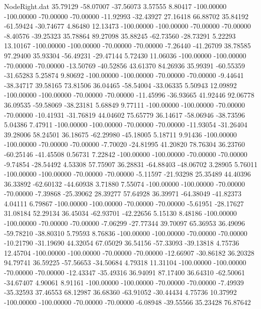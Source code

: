 \begin{filecontents}{NodeRight.dat}
  35.79129  -58.07007  -37.56073     3.57555    8.80417 -100.00000 -100.00000  -70.00000  -70.00000  -11.92993  -32.43927   27.16418   66.88702
  35.84192  -61.59424  -30.74677     4.86480   12.13473 -100.00000 -100.00000  -70.00000  -70.00000   -8.40576  -39.25323   35.78864   89.27098
  35.88245  -62.73560  -28.73291     5.22293   13.10167 -100.00000 -100.00000  -70.00000  -70.00000   -7.26440  -41.26709   38.78585   97.29400
  35.93304  -56.49231  -29.47144     5.72430   11.06036 -100.00000 -100.00000  -70.00000  -70.00000  -13.50769  -40.52856   43.61370   84.26936
  35.99391  -60.55359  -31.65283     5.25874    9.80692 -100.00000 -100.00000  -70.00000  -70.00000   -9.44641  -38.34717   39.58165   73.81506
  36.04465  -58.54004  -33.06335     5.50943   12.09892 -100.00000 -100.00000  -70.00000  -70.00000  -11.45996  -36.93665   41.92446   92.06778
  36.09535  -59.58069  -38.23181     5.68849    9.77111 -100.00000 -100.00000  -70.00000  -70.00000  -10.41931  -31.76819   44.04602   75.65779
  36.14617  -58.06946  -38.73596     5.04386    7.47911 -100.00000 -100.00000  -70.00000  -70.00000  -11.93054  -31.26404   39.28006   58.24501
  36.18675  -62.29980  -45.18005     5.18711    9.91436 -100.00000 -100.00000  -70.00000  -70.00000   -7.70020  -24.81995   41.20820   78.76304
  36.23760  -60.25146  -41.45508     0.56731    7.22842 -100.00000 -100.00000  -70.00000  -70.00000   -9.74854  -28.54492    4.53308   57.75907
  36.28831  -64.88403  -48.06702     3.28905    5.76011 -100.00000 -100.00000  -70.00000  -70.00000   -5.11597  -21.93298   25.35489   44.40396
  36.33892  -62.60132  -44.60938     3.71880    7.55074 -100.00000 -100.00000  -70.00000  -70.00000   -7.39868  -25.39062   28.39277   57.64928
  36.39971  -64.38049  -41.82373     4.04111    6.79867 -100.00000 -100.00000  -70.00000  -70.00000   -5.61951  -28.17627   31.08184   52.29134
  36.45034  -62.93701  -42.22656     5.15130    8.48186 -100.00000 -100.00000  -70.00000  -70.00000   -7.06299  -27.77344   39.70097   65.36953
  36.49096  -59.78210  -38.80310     5.79593    8.76836 -100.00000 -100.00000  -70.00000  -70.00000  -10.21790  -31.19690   44.32054   67.05029
  36.54156  -57.33093  -39.13818     4.75736   12.45704 -100.00000 -100.00000  -70.00000  -70.00000  -12.66907  -30.86182   36.20328   94.79741
  36.59225  -57.56653  -34.50684     4.79318   11.31104 -100.00000 -100.00000  -70.00000  -70.00000  -12.43347  -35.49316   36.94091   87.17400
  36.64310  -62.50061  -34.67407     4.90061    8.91161 -100.00000 -100.00000  -70.00000  -70.00000   -7.49939  -35.32593   37.46553   68.12987
  36.68360  -63.91052  -30.44434     4.75736   10.37992 -100.00000 -100.00000  -70.00000  -70.00000   -6.08948  -39.55566   35.23428   76.87642

\end{filecontents}
